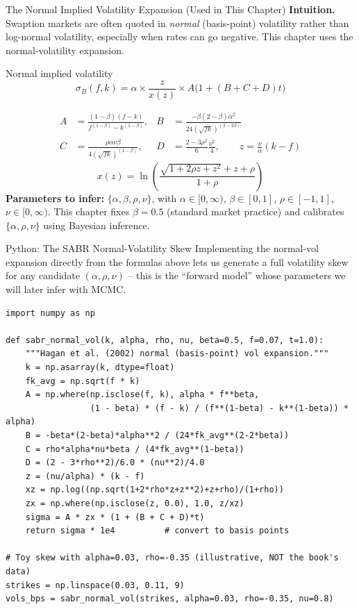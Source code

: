 \documentclass[aspectratio=169,10pt]{beamer}
\begin{document}
\begin{frame}{The Normal Implied Volatility Expansion (Used in This Chapter)}
  \textbf{Intuition.} Swaption markets are often quoted in \emph{normal}
  (basis-point) volatility rather than log-normal volatility, especially when
  rates can go negative. This chapter uses the normal-volatility expansion.
  \begin{block}{Normal implied volatility}
  \begin{equation}
    \sigma_B(f,k) = \alpha \times \frac{z}{x(z)} \times A\big(1+(B+C+D)t\big)
  \end{equation}
  \end{block}
  \begin{align*}
    A &= \frac{(1-\beta)(f-k)}{f^{(1-\beta)}-k^{(1-\beta)}}, &
    B &= \frac{-\beta(2-\beta)\alpha^2}{24(\sqrt{fk})^{(2-2\beta)}} \\
    C &= \frac{\rho\alpha\nu\beta}{4(\sqrt{fk})^{(1-\beta)}}, &
    D &= \frac{2-3\rho^2}{6}\frac{\nu^2}{4}, \qquad
    z = \frac{\nu}{\alpha}(k-f)
  \end{align*}
  \begin{equation}
    x(z) = \ln\left(\frac{\sqrt{1+2\rho z + z^2}+z+\rho}{1+\rho}\right)
  \end{equation}
  \textbf{Parameters to infer:} $\{\alpha,\beta,\rho,\nu\}$, with $\alpha \in [0,\infty)$, $\beta\in[0,1]$, $\rho\in[-1,1]$, $\nu\in[0,\infty)$. This chapter fixes $\beta=0.5$ (standard market practice) and calibrates $\{\alpha,\rho,\nu\}$ using Bayesian inference.
\end{frame}

\begin{frame}[fragile]{Python: The SABR Normal-Volatility Skew}
  Implementing the normal-vol expansion directly from the formulas above lets
  us generate a full volatility skew for any candidate $(\alpha,\rho,\nu)$ --
  this is the ``forward model'' whose parameters we will later infer with MCMC.
\begin{lstlisting}
import numpy as np

def sabr_normal_vol(k, alpha, rho, nu, beta=0.5, f=0.07, t=1.0):
    """Hagan et al. (2002) normal (basis-point) vol expansion."""
    k = np.asarray(k, dtype=float)
    fk_avg = np.sqrt(f * k)
    A = np.where(np.isclose(f, k), alpha * f**beta,
                 (1 - beta) * (f - k) / (f**(1-beta) - k**(1-beta)) * alpha)
    B = -beta*(2-beta)*alpha**2 / (24*fk_avg**(2-2*beta))
    C = rho*alpha*nu*beta / (4*fk_avg**(1-beta))
    D = (2 - 3*rho**2)/6.0 * (nu**2)/4.0
    z = (nu/alpha) * (k - f)
    xz = np.log((np.sqrt(1+2*rho*z+z**2)+z+rho)/(1+rho))
    zx = np.where(np.isclose(z, 0.0), 1.0, z/xz)
    sigma = A * zx * (1 + (B + C + D)*t)
    return sigma * 1e4          # convert to basis points

# Toy skew with alpha=0.03, rho=-0.35 (illustrative, NOT the book's data)
strikes = np.linspace(0.03, 0.11, 9)
vols_bps = sabr_normal_vol(strikes, alpha=0.03, rho=-0.35, nu=0.8)
\end{lstlisting}
\end{frame}
\end{document}
